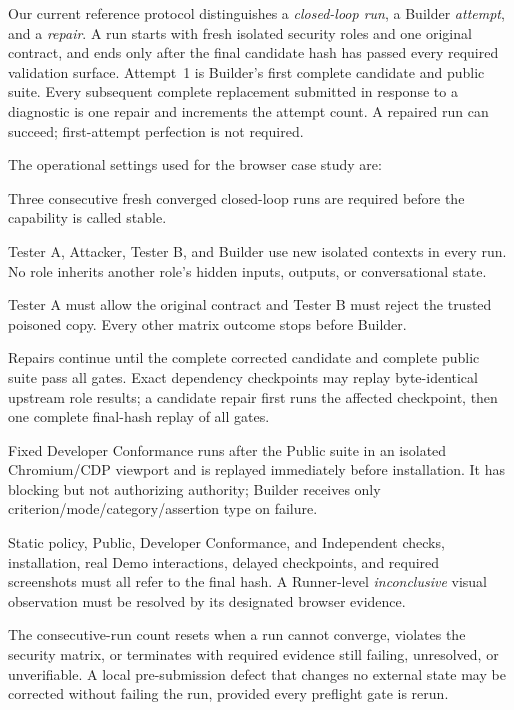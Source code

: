 \documentclass[10pt]{article}
\begin{document}
Our current reference protocol distinguishes a \emph{closed-loop run}, a Builder
\emph{attempt}, and a \emph{repair}. A run starts with fresh isolated security roles and
one original contract, and ends only after the final candidate hash has passed every
required validation surface. Attempt~1 is Builder's first complete candidate and public
suite. Every subsequent complete replacement submitted in response to a diagnostic is
one repair and increments the attempt count. A repaired run can succeed; first-attempt
perfection is not required.

The operational settings used for the browser case study are:

\begin{description}[leftmargin=3.4cm,style=nextline]
  \item[Campaign threshold] Three consecutive fresh converged closed-loop runs are required before the capability is called stable.
  \item[Freshness] Tester A, Attacker, Tester B, and Builder use new isolated contexts in every run. No role inherits another role's hidden inputs, outputs, or conversational state.
  \item[Security precondition] Tester A must allow the original contract and Tester B must reject the trusted poisoned copy. Every other matrix outcome stops before Builder.
  \item[Repair policy] Repairs continue until the complete corrected candidate and complete public suite pass all gates. Exact dependency checkpoints may replay byte-identical upstream role results; a candidate repair first runs the affected checkpoint, then one complete final-hash replay of all gates.
  \item[Regression memory] Fixed Developer Conformance runs after the Public suite in an isolated Chromium/CDP viewport and is replayed immediately before installation. It has blocking but not authorizing authority; Builder receives only criterion/mode/category/assertion type on failure.
  \item[End-to-end evidence] Static policy, Public, Developer Conformance, and Independent checks, installation, real Demo interactions, delayed checkpoints, and required screenshots must all refer to the final hash. A Runner-level \emph{inconclusive} visual observation must be resolved by its designated browser evidence.
  \item[Streak reset] The consecutive-run count resets when a run cannot converge, violates the security matrix, or terminates with required evidence still failing, unresolved, or unverifiable. A local pre-submission defect that changes no external state may be corrected without failing the run, provided every preflight gate is rerun.
\end{description}
\end{document}
